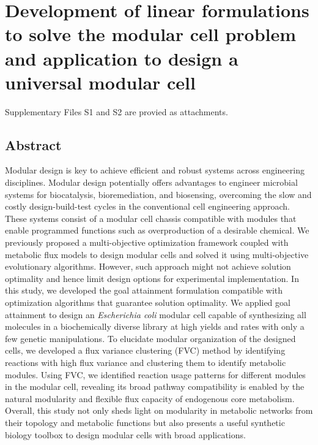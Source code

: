 \chapter{Development of linear formulations to solve the modular cell problem and application to design a universal modular cell} \label{ch:milp}

 Supplementary Files S1 and S2 are provied as attachments.

\newcommand*\mycommand[1]{\texttt{\emph{#1}}}

\section*{Abstract}
Modular design is key to achieve efficient and robust systems across engineering disciplines. Modular design potentially offers advantages to engineer microbial systems for biocatalysis, bioremediation, and biosensing, overcoming the slow and costly design-build-test cycles in the conventional cell engineering approach. These systems consist of a modular cell chassis compatible with modules that enable programmed functions such as overproduction of a desirable chemical. We previously proposed a multi-objective optimization framework coupled with metabolic flux models to design modular cells and solved it using multi-objective evolutionary algorithms. However, such approach might not achieve solution optimality and hence limit design options for experimental implementation. In this study, we developed the goal attainment formulation compatible with optimization algorithms that guarantee solution optimality. We applied goal attainment to design an \textit{Escherichia coli} modular cell capable of synthesizing all molecules in a biochemically diverse library at high yields and rates with only a few genetic manipulations. To elucidate modular organization of the designed cells, we developed a flux variance clustering (FVC) method by identifying reactions with high flux variance and clustering them to identify metabolic modules. Using FVC, we identified reaction usage patterns for different modules in the modular cell, revealing its broad pathway compatibility is enabled by the natural modularity and flexible flux capacity of endogenous core metabolism. Overall, this study not only sheds light on modularity in metabolic networks from their topology and metabolic functions but also presents a useful synthetic biology toolbox to design modular cells with broad applications.


